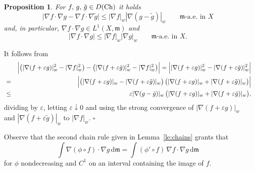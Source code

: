 \documentclass[reqno,11pt]{article}
\numberwithin{equation}{section}
\newcommand{\C}{\mathbb{C}}
\newcommand{\mm}{{\mbox{\boldmath$m$}}}
\renewcommand{\d}{{\mathrm d}}
\newcommand{\eps}{\varepsilon}
\newenvironment{proof}{\removelastskip\par\medskip   %
\noindent{\em Proof.}
\rm}{\penalty-20\null\hfill$\square$\par\medbreak}
\newtheorem{proposition}[theorem]{Proposition}
\newcommand{\weakgrad}[1]{|\nabla #1|_w}                %
\renewcommand{\C}{{\rm Ch}}
\renewcommand{\mm}{\mathfrak m}
\begin{document}
\begin{proposition}\label{eq:daunaparte}
For $f,\,g,\,\tilde{g}\in D(\C)$ it holds
\[
\big|\nabla f\cdot\nabla g-\nabla f\cdot\nabla \tilde g\big|\leq
\weakgrad f\weakgrad{(g-\tilde g)}\qquad\text{$\mm$-a.e.~in $X$}
\]
and, in particular, $\nabla f\cdot\nabla g\in L^1(X,\mm)$ and
\begin{equation} \label{eq:boundpuntuale}
|\nabla f\cdot\nabla
g|\leq\weakgrad f\weakgrad g\qquad\text{$\mm$-a.e.~in $X$.}
\end{equation}
\end{proposition}
\begin{proof} It follows from
\begin{eqnarray*}
&&\Big|\big(\weakgrad{(f+\eps g)}^2-\weakgrad
f^2\big)-\big(\weakgrad{(f+\eps \tilde g)}^2-\weakgrad
f^2\big)\Big|
=\Bigl|\weakgrad{(f+\eps g)}^2-\weakgrad{(f+\eps \tilde g)}^2\Bigr|\\
&=&\Bigl|\big(\weakgrad{(f+\eps g)}-\weakgrad{(f+\eps \tilde g)}\big)\,
\big(\weakgrad{(f+\eps g)}+\weakgrad{(f+\eps \tilde g)}\big)\Bigr|\\
&\leq&\eps\weakgrad {(g-\tilde g)}\,\big(\weakgrad{(f+\eps
g)}+\weakgrad{(f+\eps \tilde g)}\big),
\end{eqnarray*}
dividing by $\eps$, letting $\eps\downarrow 0$ and using the strong
convergence of $\weakgrad{(f+\eps g)}$ and $\weakgrad{(f+\eps\tilde
g)}$ to $\weakgrad{f}$.
\end{proof}

Observe that the second chain rule given in Lemma~\ref{le:chains}
grants that
\begin{equation}
\label{eq:chainfacile} \int\nabla (\phi\circ f)\cdot\nabla g\,\d\mm
=\int(\phi'\circ f)\,\nabla f\cdot\nabla g\,\d\mm
\end{equation}
for $\phi$ nondecreasing and $C^1$ on an interval containing the
image of $f$.
\end{document}
